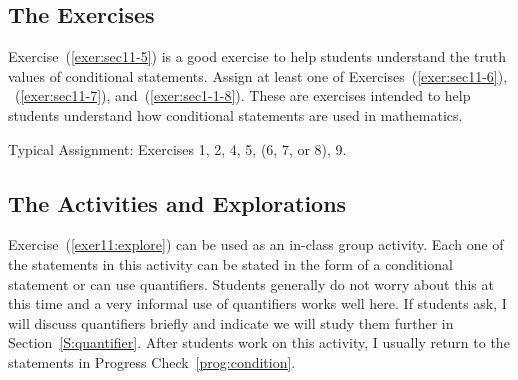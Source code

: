 \subsection*{The Exercises}

Exercise~(\ref{exer:sec11-5}) is a good exercise to help students understand the truth values of conditional statements.  Assign at least one of Exercises~(\ref{exer:sec11-6}), ~(\ref{exer:sec11-7}), and~(\ref{exer:sec1-1-8}).  These are exercises intended to help students understand how conditional statements are used in mathematics.

\vskip6pt
\noindent
Typical Assignment:  Exercises 1, 2, 4, 5, (6, 7, or 8), 9.
\hbreak

\subsection*{The Activities and Explorations}
Exercise~(\ref{exer11:explore}) can be used as an in-class group activity.  Each one of the statements in this activity can be stated in the form of a conditional statement or can use quantifiers.  Students generally do not worry about this at this time and a very informal use of quantifiers works well here.  If students ask, I will discuss quantifiers briefly and indicate we will study them further in Section~\ref{S:quantifier}.  After students work on this activity, I usually return to the statements in Progress Check~\ref{prog:condition}.
\hbreak

\endinput










\endinput
